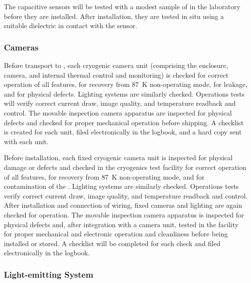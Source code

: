 The capacitive sensors will be tested with a modest sample of \lar in the laboratory before they are installed. After installation, they are tested in situ %
using a suitable dielectric in contact with the sensor.

\subsubsection{Cameras}
\label{sec:fdgen-slow-cryo-qc-c}

Before %
transport to \surf, each cryogenic camera unit (comprising the enclosure, camera, and internal thermal control and monitoring) %
is checked for correct operation of all features, for recovery from \SI{87}{K} non-operating mode, for leakage, and for physical defects. Lighting systems %
are similarly checked. Operations tests will verify correct current draw, image quality, and temperature readback and control. The movable inspection camera apparatus %
are inspected for physical defects and checked for proper mechanical operation before shipping. A checklist %
is created for each unit, filed electronically in the  logbook, and a hard copy sent with each unit. 

Before installation, each fixed cryogenic camera unit is inspected for physical damage or defects and checked in the cryogenics test facility  for correct operation of all features, for recovery from \SI{87}{K} non-operating mode, and for contamination of the \lar{}. Lighting systems are similarly checked. Operations tests verify correct current draw, image quality, and temperature readback and control. After installation and connection of wiring, fixed cameras and lighting are again  checked for operation. The movable inspection camera apparatus is inspected for physical defects and, after integration with a camera unit, tested in the facility for proper mechanical and electronic operation and cleanliness before being installed or stored. A checklist will be completed for each  check and filed electronically in the  logbook. 

\subsubsection{Light-emitting System}
\label{sec:fdgen-slow-cryo-qc-les}


